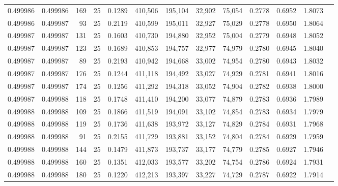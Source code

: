 \begin{tabular}{rrrrrrrrrrrrr}
0.499986 & 0.499986 &   169 &  25 &                                     0.1289 & 410,506 & 195,104 &  32,902 &  75,054 & 0.2778 & 0.6952 & 1.8073 \\
0.499986 & 0.499987 &    93 &  25 &                                     0.2119 & 410,599 & 195,011 &  32,927 &  75,029 & 0.2778 & 0.6950 & 1.8064 \\
0.499987 & 0.499987 &   131 &  25 &                                     0.1603 & 410,730 & 194,880 &  32,952 &  75,004 & 0.2779 & 0.6948 & 1.8052 \\
0.499987 & 0.499987 &   123 &  25 &                                     0.1689 & 410,853 & 194,757 &  32,977 &  74,979 & 0.2780 & 0.6945 & 1.8040 \\
0.499987 & 0.499987 &    89 &  25 &                                     0.2193 & 410,942 & 194,668 &  33,002 &  74,954 & 0.2780 & 0.6943 & 1.8032 \\
0.499987 & 0.499987 &   176 &  25 &                                     0.1244 & 411,118 & 194,492 &  33,027 &  74,929 & 0.2781 & 0.6941 & 1.8016 \\
0.499987 & 0.499987 &   174 &  25 &                                     0.1256 & 411,292 & 194,318 &  33,052 &  74,904 & 0.2782 & 0.6938 & 1.8000 \\
0.499987 & 0.499988 &   118 &  25 &                                     0.1748 & 411,410 & 194,200 &  33,077 &  74,879 & 0.2783 & 0.6936 & 1.7989 \\
0.499988 & 0.499988 &   109 &  25 &                                     0.1866 & 411,519 & 194,091 &  33,102 &  74,854 & 0.2783 & 0.6934 & 1.7979 \\
0.499988 & 0.499988 &   119 &  25 &                                     0.1736 & 411,638 & 193,972 &  33,127 &  74,829 & 0.2784 & 0.6931 & 1.7968 \\
0.499988 & 0.499988 &    91 &  25 &                                     0.2155 & 411,729 & 193,881 &  33,152 &  74,804 & 0.2784 & 0.6929 & 1.7959 \\
0.499988 & 0.499988 &   144 &  25 &                                     0.1479 & 411,873 & 193,737 &  33,177 &  74,779 & 0.2785 & 0.6927 & 1.7946 \\
0.499988 & 0.499988 &   160 &  25 &                                     0.1351 & 412,033 & 193,577 &  33,202 &  74,754 & 0.2786 & 0.6924 & 1.7931 \\
0.499988 & 0.499988 &   180 &  25 &                                     0.1220 & 412,213 & 193,397 &  33,227 &  74,729 & 0.2787 & 0.6922 & 1.7914 \\

\end{tabular}
